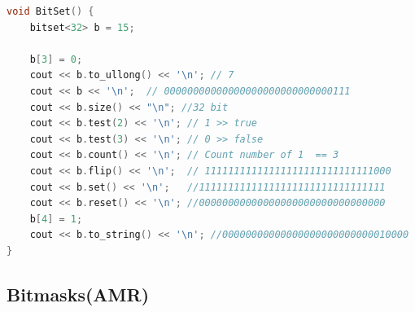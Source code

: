 \documentclass[10pt,landscape,a4paper,twocolumn]{article}
\begin{document}
\begin{lstlisting}[language=C++]
void BitSet() {
    bitset<32> b = 15;

    b[3] = 0;
    cout << b.to_ullong() << '\n'; // 7
    cout << b << '\n';  // 00000000000000000000000000000111
    cout << b.size() << "\n"; //32 bit
    cout << b.test(2) << '\n'; // 1 >> true
    cout << b.test(3) << '\n'; // 0 >> false
    cout << b.count() << '\n'; // Count number of 1  == 3
    cout << b.flip() << '\n';  // 11111111111111111111111111111000
    cout << b.set() << '\n';   //11111111111111111111111111111111
    cout << b.reset() << '\n'; //00000000000000000000000000000000
    b[4] = 1;
    cout << b.to_string() << '\n'; //00000000000000000000000000010000
}

\end{lstlisting}
\subsection{Bitmasks(AMR)}
\end{document}
